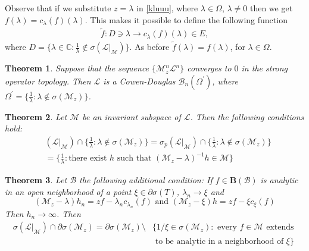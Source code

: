 \documentclass[reqno]{amsproc}
\DeclareMathOperator{\sigmap}{\sigma_{\textrm{ap}}}
\numberwithin{equation}{section}
\newtheorem{theorem}{Theorem}[section]
\theoremstyle{remark}
\newcommand*{\bscr}{\mathscr{B}}
\newcommand*{\mcal}{\mathcal{M}}
\newcommand*{\comp}{\mathbb{C}}
\newcommand*{\bou}{\boldsymbol{B}}
\theoremstyle{definition}
\newcommand{\lein}{\mathcal{L}}
\newcommand{\mul}{\mathcal{M}_z}
\newcommand{\bspace}{\mathcal{B}}
\begin{document}
Observe that if we substitute $z=\lambda$ in \eqref{kluuu}, where $\lambda\in\varOmega$, $\lambda\neq0$ then we get $f(\lambda)=c_\lambda(f)(\lambda)$.
This makes it possible to define the following function
\begin{align}\label{przed}
\tilde{f} \colon D\ni\lambda \to c_\lambda(f)(\lambda)\in E,
\end{align}
where $D = \{ \lambda \in \comp \colon \frac{1}{\lambda} \notin \sigma(\lein|_\mcal)\}$. As before $\tilde{f}(\lambda)=f(\lambda)$, for $\lambda\in \varOmega$.
\begin{theorem}\label{iscd}
    Suppose that the sequence $\{\mul^n\lein^n\}$ converges to $0$ in the strong operator topology. Then $\lein$ is a Cowen-Douglas $\bscr_n(\varOmega^\prime)$, where $\varOmega^\prime=\{ \frac{1}{\lambda}\colon \lambda \notin \sigma(\mul)\}$.
\end{theorem}
\begin{theorem}\label{dopel}
Let $\mcal$ be an invariant subspace of $\lein$. Then the following conditions hold{\em :}
    \begin{align*}
      \sigmap&(\lein|_\mcal)\cap \{ \frac{1}{\lambda}\colon \lambda \notin \sigma(\mul)\} =\sigma_p(\lein|_\mcal)\cap \{ \frac{1}{\lambda}\colon \lambda \notin \sigma(\mul)\}\\&=\{\frac{1}{\lambda}\colon \text{there exist $h$ such that }(\mul-\lambda)^{-1}h\in \mcal \}
    \end{align*}
\end{theorem}

\begin{theorem}\label{brzeg}
Let $\bspace$  the following
 additional condition: 
If $f\in \bou(\bspace)$ is analytic in an open neighborhood of a point
 $\xi\in \partial \sigma(T)$, $\lambda_n\to \xi$ and
 \begin{equation}\label{additional_cond} 
     (\mul-\lambda)h_n=zf-\lambda_n c_{\lambda_n}(f)\text{ and }  (\mul-\xi)h=zf-\xi c_\xi(f)
     \end{equation}
     Then $h_n\to \infty$.
 Then 
 \begin{align*}
\sigma(\lein|_\mcal) \cap   \partial \sigma(\mul) =
     \partial \sigma(\mul) \setminus&
 \{1/\xi \in \sigma(\mul) \colon \text{ every } f \in \mcal\text{ extends }\\& \text{ to be analytic in a neighborhood of } \xi \}
 \end{align*}
\end{theorem}
\end{document}
